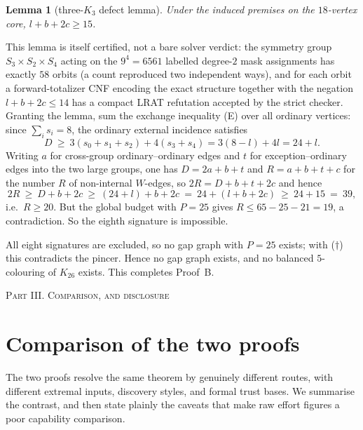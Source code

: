 \documentclass[11pt,reqno]{amsart}
\newtheorem{lemma}[theorem]{Lemma}
\theoremstyle{definition}
\theoremstyle{remark}
\newcommand{\ppart}[1]{%
  \bigskip\par\begin{center}\normalfont\scshape\large #1\end{center}%
  \nopagebreak\medskip}
\begin{document}
\begin{lemma}[three-$K_3$ defect lemma]\label{lem:B-defect}
Under the induced premises on the $18$-vertex core, $l+b+2c\ge 15$.
\end{lemma}

This lemma is itself certified, not a bare solver verdict: the symmetry group
$S_3\times S_2\times S_4$ acting on the $9^4=6561$ labelled degree-$2$ mask assignments
has exactly $58$ orbits (a count reproduced two independent ways), and for each orbit a
forward-totalizer CNF encoding the exact structure together with the negation
$l+b+2c\le 14$ has a compact LRAT refutation accepted by the strict checker. Granting the
lemma, sum the exchange inequality (E) over all ordinary vertices: since $\sum_i s_i=8$,
the ordinary external incidence satisfies
\[
  D\ \ge\ 3(s_0+s_1+s_2)+4(s_3+s_4)=3(8-l)+4l=24+l.
\]
Writing $a$ for cross-group ordinary--ordinary edges and $t$ for exception--ordinary edges
into the two large groups, one has $D=2a+b+t$ and $R=a+b+t+c$ for the number $R$ of
non-internal $W$-edges, so $2R=D+b+t+2c$ and hence
\[
  2R\ \ge\ D+b+2c\ \ge\ (24+l)+b+2c\ =\ 24+(l+b+2c)\ \ge\ 24+15\ =\ 39,
\]
i.e.\ $R\ge 20$. But the global budget with $P=25$ gives $R\le 65-25-21=19$, a
contradiction. So the eighth signature is impossible.

All eight signatures are excluded, so no gap graph with $P=25$ exists; with ($\dagger$)
this contradicts the pincer. Hence no gap graph exists, and no balanced $5$-colouring of
$K_{26}$ exists. This completes Proof~B.

\ppart{Part III. Comparison, and disclosure}

\section{Comparison of the two proofs}\label{sec:comparison}
The two proofs resolve the same theorem by genuinely different routes, with different
extremal inputs, discovery styles, and formal trust bases. We summarise the contrast, and
then state plainly the caveats that make raw effort figures a poor capability comparison.
\end{document}
